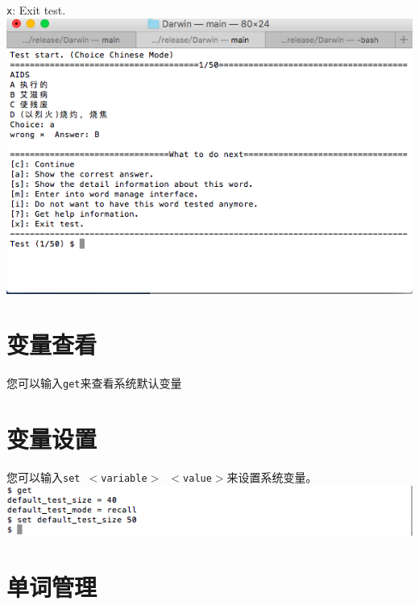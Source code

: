 \texttt{x}: Exit test.
\includegraphics[keepaspectratio,width=\textwidth,height=0.75\textheight]{picture5.png}

\section{变量查看}
\label{}

您可以输入\texttt{get}来查看系统默认变量

\section{变量设置}
\label{}

您可以输入\texttt{set $<$variable$>$ $<$value$>$}来设置系统变量。
\includegraphics[keepaspectratio,width=\textwidth,height=0.75\textheight]{picture6.png}

\section{单词管理}
\label{}
